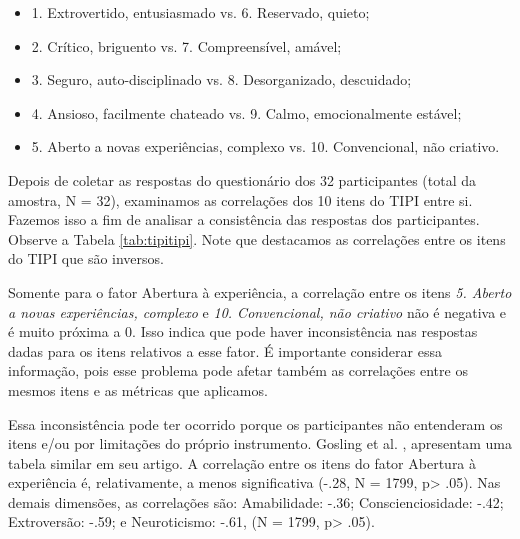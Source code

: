 \begin{itemize}
\item 1. Extrovertido, entusiasmado vs. 6. Reservado, quieto;
\item 2. Crítico, briguento vs. 7. Compreensível, amável;
\item 3. Seguro, auto-disciplinado vs. 8. Desorganizado, descuidado;
\item 4. Ansioso, facilmente chateado vs. 9. Calmo, emocionalmente estável;
\item 5. Aberto a novas experiências, complexo vs. 10. Convencional, não criativo.
\end{itemize}

Depois de coletar as respostas do questionário dos 32 participantes (total da amostra, N = 32),
examinamos as correlações dos 10 itens do TIPI entre si.
Fazemos isso a fim de analisar a consistência das respostas dos participantes. Observe a Tabela \ref{tab:tipitipi}.
Note que destacamos as correlações entre os itens do TIPI que são inversos. 


Somente para o fator Abertura à experiência, a correlação entre os itens \textit{5. Aberto a novas experiências, complexo} e \textit{10. Convencional, não criativo} não é negativa e é muito próxima a 0. Isso indica que pode haver inconsistência nas respostas dadas para os itens relativos a esse fator.
É importante considerar essa informação, pois esse problema pode afetar também as correlações entre os mesmos itens e as métricas que aplicamos.

Essa inconsistência pode ter ocorrido porque os participantes não entenderam os itens e/ou por limitações do próprio instrumento. Gosling et al. \cite{gosling:03}, apresentam uma tabela similar em seu artigo. A correlação entre os itens do fator Abertura à experiência é, relativamente, a menos significativa (-.28, N = 1799, p> .05).
Nas demais dimensões, as correlações são: Amabilidade: -.36; Conscienciosidade: -.42; Extroversão: -.59; e Neuroticismo: -.61, (N = 1799, p> .05).

